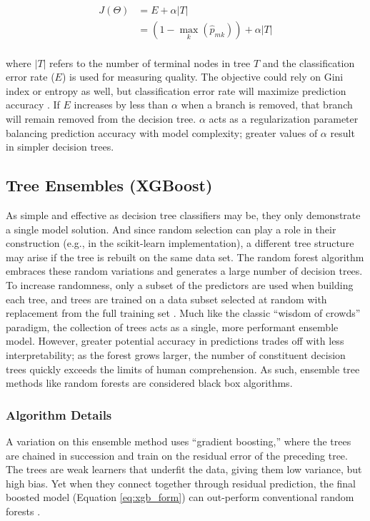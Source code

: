 \begin{equation}
\label{dtree_objective}
\begin{aligned}
    J(\Theta) &= E + \alpha\left|T\right| \\
    &= \left(1 - \max_k(\hat{p}_{mk})\right)+\alpha\left|T\right|
\end{aligned}
\end{equation}
\\
where $\left|T\right|$ refers to the number of terminal nodes in tree $T$ and the classification error rate ($E$) is used for measuring quality. The objective could rely on Gini index or entropy as well, but classification error rate will maximize prediction accuracy \citep[p.\ 312]{james_introduction_2013}. If $E$ increases by less than $\alpha$ when a branch is removed, that branch will remain removed from the decision tree. $\alpha$ acts as a regularization parameter balancing prediction accuracy with model complexity; greater values of $\alpha$ result in simpler decision trees.

\subsection{Tree Ensembles (XGBoost)}\label{ch3:tree_ensembles}
As simple and effective as decision tree classifiers may be, they only demonstrate a single model solution. And since random selection can play a role in their construction (e.g., in the scikit-learn implementation), a different tree structure may arise if the tree is rebuilt on the same data set. The random forest algorithm embraces these random variations and generates a large number of decision trees. To increase randomness, only a subset of the predictors are used when building each tree, and trees are trained on a data subset selected at random with replacement from the full training set \citep[p. 376--377]{bertsimas_analytics_2016}. Much like the classic ``wisdom of crowds'' paradigm, the collection of trees acts as a single, more performant ensemble model. However, greater potential accuracy in predictions trades off with less interpretability; as the forest grows larger, the number of constituent decision trees quickly exceeds the limits of human comprehension. As such, ensemble tree methods like random forests are considered black box algorithms.

\subsubsection{Algorithm Details}\label{ch3:xgb_details}
A variation on this ensemble method uses ``gradient boosting,'' where the trees are chained in succession and train on the residual error of the preceding tree. The trees are weak learners that underfit the data, giving them low variance, but high bias. Yet when they connect together through residual prediction, the final boosted model (Equation \ref{eq:xgb_form}) can out-perform conventional random forests \citep[p. 323]{james_introduction_2013}.

